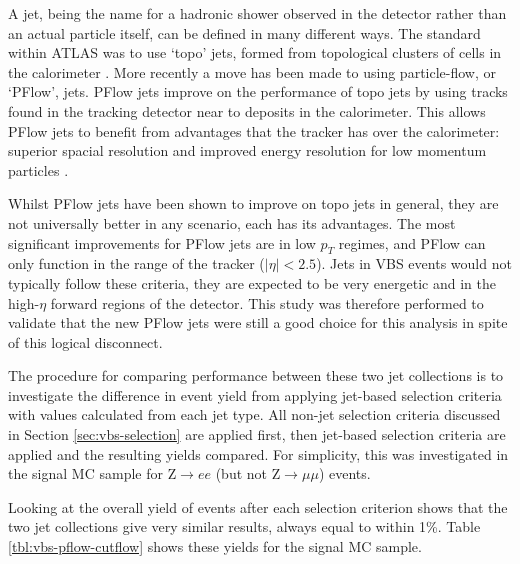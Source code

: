 
A jet, being the name for a hadronic shower observed in the detector rather than
an actual particle itself, can be defined in many different ways. The standard
within \ac{ATLAS} was to use `topo' jets, formed from topological clusters of
cells in the calorimeter \cite{Aad2017b}. More recently a move has been made to
using particle-flow, or `PFlow', jets. PFlow jets improve on the performance of
topo jets by using tracks found in the tracking detector near to deposits in the
calorimeter. This allows PFlow jets to benefit from advantages that the tracker
has over the calorimeter: superior spacial resolution and improved energy
resolution for low momentum particles \cite{Aaboud2017a}.

Whilst PFlow jets have been shown to improve on topo jets in general, they are
not universally better in any scenario, each has its advantages. The most
significant improvements for PFlow jets are in low $p_T$ regimes, and PFlow can
only function in the range of the tracker ($|\eta| < 2.5$). Jets in \ac{VBS}
events would not typically follow these criteria, they are expected to be very
energetic and in the high-$\eta$ forward regions of the detector. This study was
therefore performed to validate that the new PFlow jets were still a good choice
for this analysis in spite of this logical disconnect.

The procedure for comparing performance between these two jet collections is to
investigate the difference in event yield from applying jet-based selection
criteria with values calculated from each jet type. All non-jet selection
criteria discussed in Section \ref{sec:vbs-selection} are applied first, then
jet-based selection criteria are applied and the resulting yields compared. For
simplicity, this was investigated in the signal \ac{MC} sample for Z$\to ee$
(but not Z$\to\mu\mu$) events.

Looking at the overall yield of events after each selection criterion shows that
the two jet collections give very similar results, always equal to within 1\%.
Table \ref{tbl:vbs-pflow-cutflow} shows these yields for the signal \ac{MC}
sample.

